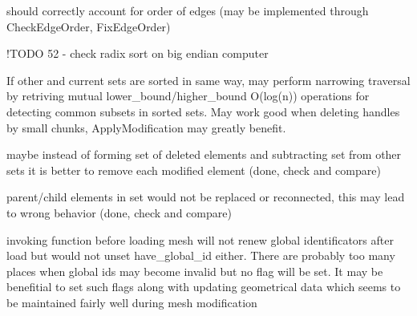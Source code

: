 \begin{DoxyRefList}
\begin{DoxyEnumerate}
\item should correctly account for order of edges (may be implemented through Check\-Edge\-Order, Fix\-Edge\-Order)  
\end{DoxyEnumerate}
\item[\label{todo__todo000009}%
\hypertarget{todo__todo000009}{}%
Member \hyperlink{classINMOST_1_1ElementSet_a96676712005ce12f0c1f9a92c6ac095d}{I\-N\-M\-O\-S\-T\-:\-:Element\-Set\-:\-:Sort\-Set} (Comparator\-Type comp) const ]!\-T\-O\-D\-O 52 -\/ check radix sort on big endian computer  
\item[\label{todo__todo000008}%
\hypertarget{todo__todo000008}{}%
Member \hyperlink{classINMOST_1_1ElementSet_a1aafea0ac742bcc3ec1873621ca41ccd}{I\-N\-M\-O\-S\-T\-:\-:Element\-Set\-:\-:Subtract} (const Element\-Set \&other) const ]If other and current sets are sorted in same way, may perform narrowing traversal by retriving mutual lower\-\_\-bound/higher\-\_\-bound O(log(n)) operations for detecting common subsets in sorted sets. May work good when deleting handles by small chunks, Apply\-Modification may greatly benefit.  
\item[\label{todo__todo000017}%
\hypertarget{todo__todo000017}{}%
Member \hyperlink{classINMOST_1_1Mesh_a1f53070855f3503b2f4cefc16cedd6a0}{I\-N\-M\-O\-S\-T\-:\-:Mesh\-:\-:Apply\-Modification} ()]
\begin{DoxyEnumerate}
\item maybe instead of forming set of deleted elements and subtracting set from other sets it is better to remove each modified element (done, check and compare)
\item parent/child elements in set would not be replaced or reconnected, this may lead to wrong behavior (done, check and compare)  
\end{DoxyEnumerate}
\item[\label{todo__todo000011}%
\hypertarget{todo__todo000011}{}%
Member \hyperlink{classINMOST_1_1Mesh_ae39e30b11f35de81d2a9b8451ef87391}{I\-N\-M\-O\-S\-T\-:\-:Mesh\-:\-:Assign\-Global\-I\-D} (Element\-Type mask)]
\begin{DoxyEnumerate}
\item invoking function before loading mesh will not renew global identificators after load but would not unset have\-\_\-global\-\_\-id either. There are probably too many places when global ids may become invalid but no flag will be set. It may be benefitial to set such flags along with updating geometrical data which seems to be maintained fairly well during mesh modification  
\end{DoxyEnumerate}

\end{DoxyRefList}
